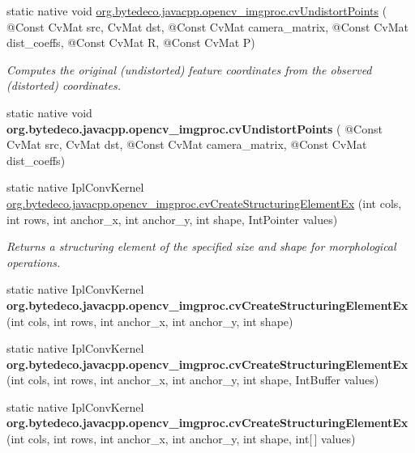 \begin{DoxyCompactItemize}
static native void \hyperlink{group__imgproc__c_ga21444b957a9e68dffef016a844ff35a1}{org.\+bytedeco.\+javacpp.\+opencv\+\_\+imgproc.\+cv\+Undistort\+Points} ( @Const Cv\+Mat src, Cv\+Mat dst, @Const Cv\+Mat camera\+\_\+matrix, @Const Cv\+Mat dist\+\_\+coeffs, @Const Cv\+Mat R, @Const Cv\+Mat P)
\begin{DoxyCompactList}\small\item\em Computes the original (undistorted) feature coordinates from the observed (distorted) coordinates. \end{DoxyCompactList}\item 
\mbox{\label{group__imgproc__c_gafad2f45e5f04b0a7afb4f99f0dc6d132}} 
static native void {\bfseries org.\+bytedeco.\+javacpp.\+opencv\+\_\+imgproc.\+cv\+Undistort\+Points} ( @Const Cv\+Mat src, Cv\+Mat dst, @Const Cv\+Mat camera\+\_\+matrix, @Const Cv\+Mat dist\+\_\+coeffs)
\item 
static native Ipl\+Conv\+Kernel \hyperlink{group__imgproc__c_ga8a9b8019d4c181721e0f3fbb6c87cb42}{org.\+bytedeco.\+javacpp.\+opencv\+\_\+imgproc.\+cv\+Create\+Structuring\+Element\+Ex} (int cols, int rows, int anchor\+\_\+x, int anchor\+\_\+y, int shape, Int\+Pointer values)
\begin{DoxyCompactList}\small\item\em Returns a structuring element of the specified size and shape for morphological operations. \end{DoxyCompactList}\item 
\mbox{\label{group__imgproc__c_gaaeb2e2cb26f6ce5bbdab4fe2c36e6499}} 
static native Ipl\+Conv\+Kernel {\bfseries org.\+bytedeco.\+javacpp.\+opencv\+\_\+imgproc.\+cv\+Create\+Structuring\+Element\+Ex} (int cols, int rows, int anchor\+\_\+x, int anchor\+\_\+y, int shape)
\item 
\mbox{\label{group__imgproc__c_ga00f06c891fe2d38754ff782f51724422}} 
static native Ipl\+Conv\+Kernel {\bfseries org.\+bytedeco.\+javacpp.\+opencv\+\_\+imgproc.\+cv\+Create\+Structuring\+Element\+Ex} (int cols, int rows, int anchor\+\_\+x, int anchor\+\_\+y, int shape, Int\+Buffer values)
\item 
\mbox{\label{group__imgproc__c_ga5393a3cd702399576b9f4b29d175519f}} 
static native Ipl\+Conv\+Kernel {\bfseries org.\+bytedeco.\+javacpp.\+opencv\+\_\+imgproc.\+cv\+Create\+Structuring\+Element\+Ex} (int cols, int rows, int anchor\+\_\+x, int anchor\+\_\+y, int shape, int\mbox{[}$\,$\mbox{]} values)

\end{DoxyCompactItemize}
